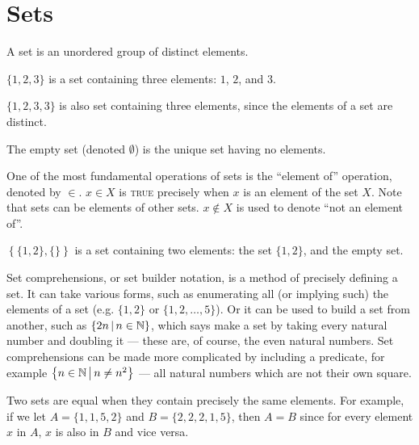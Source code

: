 \section{Sets}

\begin{defn}\label{set}
    A set is an unordered group of distinct elements.
\end{defn}

\begin{exmp}
    $\{1, 2, 3\}$ is a set containing three elements: $1$, $2$, and $3$.
\end{exmp}

\begin{rmk}
    $\{1, 2, 3, 3\}$ is also set containing three elements, since the elements of a set are distinct.
\end{rmk}

\begin{defn}\label{empty-set}
    The empty set (denoted $\emptyset$) is the unique set having no elements.
\end{defn}

One of the most fundamental operations of sets is the ``element of'' operation, denoted by $\in$. $x \in X$ is \textsc{true} precisely when $x$ is an element of the set $X$. Note that sets can be elements of other sets. $x \notin X$ is used to denote ``not an element of''.

\begin{exmp}
    $\left\{\{1, 2\}, \{\}\right\}$ is a set containing two elements: the set $\{1, 2\}$, and the empty set.
\end{exmp}

Set comprehensions, or set builder notation, is a method of precisely defining a set. It can take various forms, such as enumerating all (or implying such) the elements of a set (e.g. $\{1, 2\}$ or $\{1, 2, \ldots, 5\}$). Or it can be used to build a set from another, such as $\left\{2n \,\middle|\, n \in \mathbb{N}\right\}$, which says make a set by taking every natural number and doubling it --- these are, of course, the even natural numbers. Set comprehensions can be made more complicated by including a predicate, for example $\left\{n \in \mathbb{N} \,\middle|\, n \neq n^2 \right\}$ --- all natural numbers which are not their own square.

Two sets are equal when they contain precisely the same elements. For example, if we let $A = \{1, 1, 5, 2\}$ and $B = \{2, 2, 2, 1, 5\}$, then $A = B$ since for every element $x$ in $A$, $x$ is also in $B$ and vice versa.

